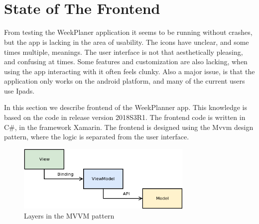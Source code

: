 \section{\\State of The Frontend} \label{sec:StateFrontend}

From testing the WeekPlaner application it seems to be running without crashes,  but the app is lacking in the area of usability. The icons have unclear, and some times multiple, meanings. The user interface is not that aesthetically pleasing, and confusing at times. Some features and customization are also lacking, when using the app interacting with it often feels clunky.
Also a major issue, is that the application only works on the android platform, and many of the current users use Ipads.

In this section we describe frontend of the WeekPlanner app. This knowledge is based on the code in release version 2018S3R1. 
The frontend code is written in C\#, in the framework Xamarin. The frontend is designed using the \gls{Mvvm} design pattern, where the logic is separated from the user interface. 
\begin{figure}[ht]
    \begin{small}
        \begin{center}
            \includegraphics[width=0.75\textwidth]{figures/MVVM_diagram}
        \end{center}
        \caption{Layers in the MVVM pattern}
        \label{fig:MVVM}
    \end{small}
\end{figure}

